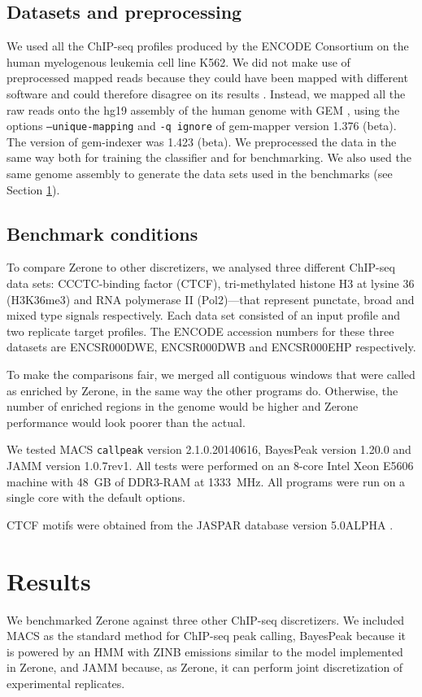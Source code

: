 \documentclass{bioinfo}
\begin{document}
\begin{methods}
\subsection{Datasets and preprocessing}
We used all the ChIP-seq profiles produced by the ENCODE Consortium
on the human myelogenous leukemia cell line K562. We did not make use
of preprocessed mapped reads because they could have been mapped with
different software and could therefore disagree on its results
\citep{pmid21059603}. Instead, we mapped all the raw reads onto the
hg19 assembly of the human genome with GEM \citep{pmid23103880}, using
the options \texttt{--unique-mapping} and \texttt{-q ignore} of gem-mapper
version 1.376 (beta). The version of gem-indexer was 1.423 (beta). We
preprocessed the data in the same way both for training the classifier
and for benchmarking. We also used the same genome assembly to generate
the data sets used in the benchmarks (see Section \ref{sec:results}).

\subsection{Benchmark conditions}
To compare Zerone to other discretizers, we analysed three different
ChIP-seq data sets: CCCTC-binding factor (CTCF), tri-methylated histone H3 at
lysine 36 (H3K36me3) and RNA polymerase II (Pol2)---that represent punctate,
broad and mixed type signals respectively. Each data set consisted of an input
profile and two replicate target profiles. The ENCODE accession numbers for
these three datasets are ENCSR000DWE, ENCSR000DWB and ENCSR000EHP respectively.

To make the comparisons fair, we merged all contiguous windows that were called
as enriched by Zerone, in the same way the other programs do. Otherwise, the
number of enriched regions in the genome would be higher and Zerone performance
would look poorer than the actual.

We tested MACS \texttt{callpeak} version 2.1.0.20140616, BayesPeak
version 1.20.0 and JAMM version 1.0.7rev1. All tests were performed on
an 8-core Intel Xeon E5606 machine with 48~GB of DDR3-RAM at 1333~MHz.
All programs were run on a single core with the default options.

CTCF motifs were obtained from the JASPAR database version
5.0{\textunderscore}ALPHA \citep{pmid24194598}.

\end{methods}

\section{Results}
\label{sec:results}
We benchmarked Zerone against three other ChIP-seq discretizers.
We included MACS as the standard method for ChIP-seq peak calling,
BayesPeak because it is powered by an HMM with ZINB emissions
similar to the model implemented in Zerone, and JAMM because, as
Zerone, it can perform joint discretization of experimental replicates.
\end{document}

